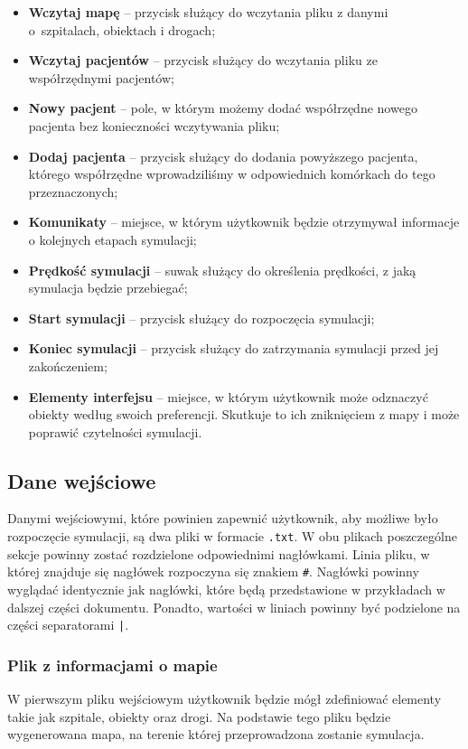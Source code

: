 \documentclass[12pt,a4paper]{article}
\begin{document}
\begin{itemize}
\item \textbf{Wczytaj mapę} – przycisk służący do wczytania pliku z danymi o~szpitalach, obiektach i drogach;
\item \textbf{Wczytaj pacjentów} – przycisk służący do wczytania pliku ze współrzędnymi pacjentów;
\item \textbf{Nowy pacjent} – pole, w którym możemy dodać współrzędne nowego pacjenta bez konieczności wczytywania pliku;
\item \textbf{Dodaj pacjenta} – przycisk służący do dodania powyższego pacjenta, którego współrzędne wprowadziliśmy w odpowiednich komórkach do tego przeznaczonych;
\item \textbf{Komunikaty} – miejsce, w którym użytkownik będzie otrzymywał informacje o kolejnych etapach symulacji;
\item \textbf{Prędkość symulacji} – suwak służący do określenia prędkości, z jaką symulacja będzie przebiegać;
\item \textbf{Start symulacji} – przycisk służący do rozpoczęcia symulacji;
\item \textbf{Koniec symulacji} – przycisk służący do zatrzymania symulacji przed jej zakończeniem;
\item \textbf{Elementy interfejsu} – miejsce, w którym użytkownik może odznaczyć obiekty według swoich preferencji. Skutkuje to ich zniknięciem z mapy i może poprawić czytelności symulacji.
\end{itemize}

\subsection{Dane wejściowe}
Danymi wejściowymi, które powinien zapewnić użytkownik, aby możliwe było rozpoczęcie symulacji, są dwa pliki w formacie \texttt{.txt}. W obu plikach poszczególne sekcje powinny zostać rozdzielone odpowiednimi nagłówkami. Linia pliku, w której znajduje się nagłówek rozpoczyna się znakiem \texttt{\#}. Nagłówki powinny wyglądać identycznie jak nagłówki, które będą przedstawione w przykładach w dalszej części dokumentu. Ponadto, wartości w liniach powinny być podzielone na części separatorami \texttt{|}.

\newpage
\subsubsection{Plik z informacjami o mapie}
W pierwszym pliku wejściowym użytkownik będzie mógł zdefiniować elementy takie jak szpitale, obiekty oraz drogi. Na podstawie tego pliku będzie wygenerowana mapa, na terenie której przeprowadzona zostanie symulacja.
 
\end{document}
